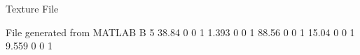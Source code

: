 Texture File

File generated from MATLAB
B 5
   38.84	0	0	1
   1.393	0	0	1
   88.56	0	0	1
   15.04	0	0	1
   9.559	0	0	1